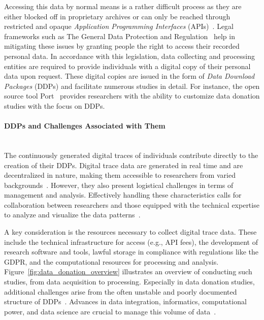 \documentclass{DESSThesis}
\begin{document}
Accessing this data by normal means is a rather difficult process as they are either blocked off in proprietary archives or can only be reached through restricted and opaque \emph{Application Programming Interfaces} (APIs)~\cite{Boeschoten2023}. Legal frameworks such as The General Data Protection and Regulation~\cite{europeanParliament2016a} help in mitigating these issues by granting people the right to access their recorded personal data. In accordance with this legislation, data collecting and processing entities are required to provide individuals with a digital copy of their personal data upon request. These digital copies are issued in the form of \emph{Data Download Packages} (DDPs) and facilitate numerous studies in detail. For instance, the open source tool Port~\cite{Boeschoten2023} provides researchers with the ability to customize data donation studies with the focus on DDPs.

\paragraph{DDPs and Challenges Associated with Them}\mbox{}\\

\noindent The continuously generated digital traces of individuals contribute directly to the creation of their DDPs. Digital trace data are generated in real time and are decentralized in nature, making them accessible to researchers from varied backgrounds~\cite{Cesare_Lee_McCormick_Spiro_Zagheni_2018}. However, they also present logistical challenges in terms of management and analysis. Effectively handling these characteristics calls for collaboration between researchers and those equipped with the technical expertise to analyze and visualize the data patterns~\cite{Cesare_Lee_McCormick_Spiro_Zagheni_2018}.

A key consideration is the resources necessary to collect digital trace data. These include the technical infrastructure for access (e.g., API fees), the development of research software and tools, lawful storage in compliance with regulations like the GDPR, and the computational resources for processing and analysis. Figure~\ref{fig:data_donation_overview} illustrates an overview of conducting such studies, from data acquisition to processing. Especially in data donation studies, additional challenges arise from the often unstable and poorly documented structure of DDPs~\cite{Ohme_Araujo_Boeschoten_Freelon_Ram_Reeves_Robinson_2024}. Advances in data integration, informatics, computational power, and data science are crucial to manage this volume of data~\cite{doi:10.1161/CIRCOUTCOMES.123.010150}.
\end{document}

